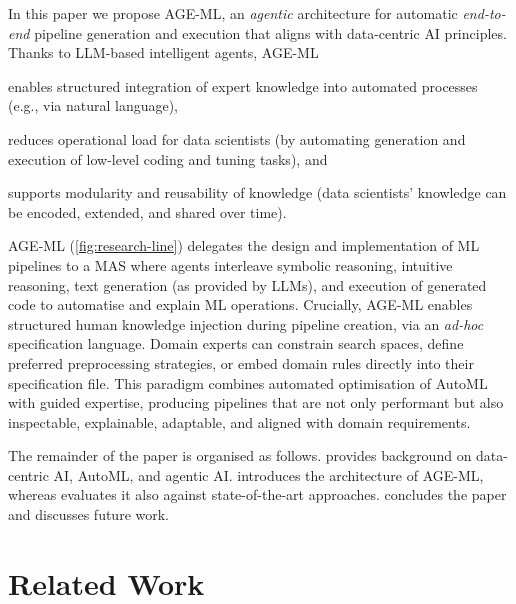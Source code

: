 \documentclass[runningheads]{llncs}
\newenvironment{inlinelist}{\begin{enumerate*}[label=\emph{(\roman*)}]}{\end{enumerate*}}
\newcommand{\ourapproach}[0]{\textsc{AGE-ML}}
\begin{document}
In this paper we propose \ourapproach{}, an \emph{agentic} architecture for automatic \emph{end-to-end} pipeline generation and execution that aligns with data-centric \ac{AI} principles.
%
Thanks to \ac{LLM}-based intelligent agents, \ourapproach{}
\begin{inlinelist}
    \item enables structured integration of expert knowledge into automated processes
    (e.g., via natural language),
    \item reduces operational load for data scientists
    (by automating generation and execution of low-level coding and tuning tasks),
    and
    \item supports modularity and reusability of knowledge
    (data scientists' knowledge can be encoded, extended, and shared over time).
\end{inlinelist}
\ourapproach{}
(\cref{fig:research-line})
delegates the design and implementation of \ac{ML} pipelines to a \ac{MAS}
where agents interleave symbolic reasoning, intuitive reasoning, text generation
(as provided by \acp{LLM}),
and execution of generated code
to automatise and explain \ac{ML} operations.
%
Crucially,
\ourapproach{} enables structured human knowledge injection during pipeline creation,
via an \emph{ad-hoc} specification language.
%
Domain experts can constrain search spaces,
define preferred preprocessing strategies,
or
embed domain rules directly into their specification file.
%
This paradigm combines automated optimisation of AutoML with guided expertise,
producing pipelines that are not only performant but also inspectable, explainable, adaptable,
and aligned with domain requirements.



The remainder of the paper is organised as follows.
 provides background on data-centric \ac{AI}, \ac{AutoML}, and agentic \ac{AI}.
 introduces the architecture of \ourapproach{}, whereas  evaluates it also against state-of-the-art approaches.
 concludes the paper and discusses future work.

\section{Related Work}
\label{sec:background-and-motivation}
\end{document}
